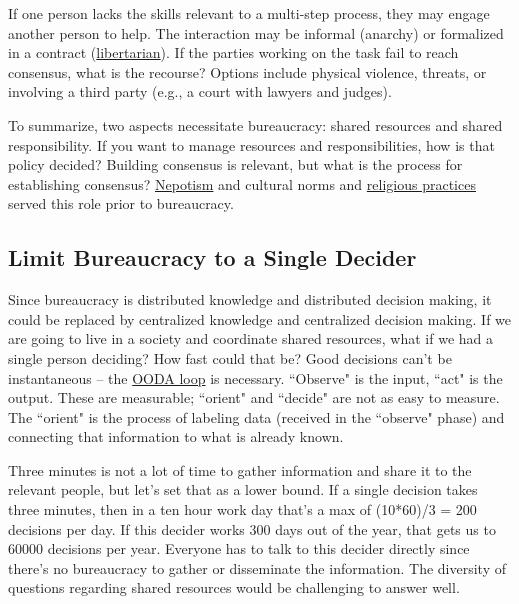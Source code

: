 If one person lacks the skills relevant to a multi-step process, they may engage another person to help. The interaction may be informal (anarchy) or formalized in a contract (\href{https://en.wikipedia.org/wiki/Libertarianism}{libertarian}). If the parties working on the task fail to reach consensus, what is the recourse? Options include physical violence, threats, or involving a third party (e.g., a court with lawyers and judges). 


To summarize, two aspects necessitate bureaucracy: shared resources and shared responsibility. 
If you want to manage resources and responsibilities, how is that policy decided?  Building consensus is relevant, but what is the process for establishing consensus? \href{https://en.wikipedia.org/wiki/Nepotism}{Nepotism} and cultural norms and \href{https://en.wikipedia.org/wiki/Religion}{religious practices} served this role prior to bureaucracy. 


\subsection*{Limit Bureaucracy to a Single Decider\label{sec:single-decider}}

Since bureaucracy is distributed knowledge and distributed decision making, it could be replaced by centralized knowledge and centralized decision making. If we are going to live in a society and coordinate shared resources, what if we had a single person deciding? How fast could that be? Good decisions can't be instantaneous -- the \href{https://en.wikipedia.org/wiki/OODA_loop}{OODA loop} is necessary. 
``Observe" is the input, ``act" is the output. These are measurable; ``orient" and ``decide" are not as easy to measure. The ``orient" is the process of labeling data (received in the ``observe" phase) and connecting that information to what is already known.

Three minutes is not a lot of time to gather information and share it to the relevant people, but let's set that as a lower bound.
If a single decision takes three minutes, then in a ten hour work day that's a max of (10*60)/3 = 200 decisions per day. If this decider works 300 days out of the year, that gets us to 60000 decisions per year. Everyone has to talk to this decider directly since there's no bureaucracy to gather or disseminate the information. The diversity of questions regarding shared resources would be challenging to answer well.

